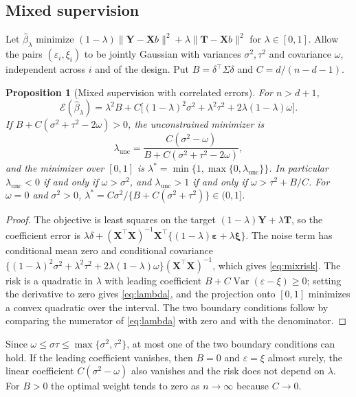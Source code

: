 \documentclass[11pt]{article}
\newtheorem{proposition}[theorem]{Proposition}
\theoremstyle{remark}
\newcommand{\Var}{\operatorname{Var}}
\newcommand{\1}{\mathbf 1}
\begin{document}
\subsection{Mixed supervision}
Let $\widehat\beta_\lambda$ minimize $(1-\lambda)\|\mathbf Y-\mathbf Xb\|^2+\lambda\|\mathbf T-\mathbf Xb\|^2$ for $\lambda\in[0,1]$. Allow the pairs $(\varepsilon_i,\xi_i)$ to be jointly Gaussian with variances $\sigma^2,\tau^2$ and covariance $\omega$, independent across $i$ and of the design. Put $B=\delta^\top\Sigma\delta$ and $C=d/(n-d-1)$.

\begin{proposition}[Mixed supervision with correlated errors]\label{th:mix}
For $n>d+1$,
\begin{equation}\label{eq:mixrisk}
\mathcal E(\widehat\beta_\lambda)=\lambda^2B+C\big[(1-\lambda)^2\sigma^2+\lambda^2\tau^2+2\lambda(1-\lambda)\omega\big].
\end{equation}
If $B+C(\sigma^2+\tau^2-2\omega)>0$, the unconstrained minimizer is
\begin{equation}\label{eq:lambda}
\lambda_{\mathrm{unc}}=\frac{C(\sigma^2-\omega)}{B+C(\sigma^2+\tau^2-2\omega)},
\end{equation}
and the minimizer over $[0,1]$ is $\lambda^*=\min\{1,\max\{0,\lambda_{\mathrm{unc}}\}\}$. In particular $\lambda_{\mathrm{unc}}<0$ if and only if $\omega>\sigma^2$, and $\lambda_{\mathrm{unc}}>1$ if and only if $\omega>\tau^2+B/C$. For $\omega=0$ and $\sigma^2>0$, $\lambda^*=C\sigma^2/\{B+C(\sigma^2+\tau^2)\}\in(0,1]$.
\end{proposition}
\begin{proof}
The objective is least squares on the target $(1-\lambda)\mathbf Y+\lambda\mathbf T$, so the coefficient error is $\lambda\delta+(\mathbf X^\top\mathbf X)^{-1}\mathbf X^\top\{(1-\lambda)\bm\varepsilon+\lambda\bm\xi\}$. The noise term has conditional mean zero and conditional covariance $\{(1-\lambda)^2\sigma^2+\lambda^2\tau^2+2\lambda(1-\lambda)\omega\}(\mathbf X^\top\mathbf X)^{-1}$, which gives \eqref{eq:mixrisk}. The risk is a quadratic in $\lambda$ with leading coefficient $B+C\Var(\varepsilon-\xi)\ge0$; setting the derivative to zero gives \eqref{eq:lambda}, and the projection onto $[0,1]$ minimizes a convex quadratic over the interval. The two boundary conditions follow by comparing the numerator of \eqref{eq:lambda} with zero and with the denominator.
\end{proof}

Since $\omega\le\sigma\tau\le\max\{\sigma^2,\tau^2\}$, at most one of the two boundary conditions can hold. If the leading coefficient vanishes, then $B=0$ and $\varepsilon=\xi$ almost surely, the linear coefficient $C(\sigma^2-\omega)$ also vanishes and the risk does not depend on $\lambda$. For $B>0$ the optimal weight tends to zero as $n\to\infty$ because $C\to0$.
\end{document}

